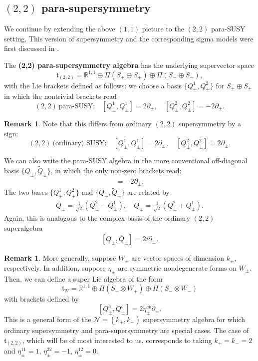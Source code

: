\documentclass[letterpaper,12pt]{article}
\newcommand{\RR}{\mathbb{R}}
\newcommand{\cN}{\mathcal{N}}
\newcommand{\p}{\partial}
\newcommand{\wtl}{\widetilde}
\theoremstyle{definition}
\newtheorem{remark}[theorem]{Remark}
\theoremstyle{remark}
\theoremstyle{examples}
\begin{document}
\subsection{$(2,2)$ para-supersymmetry}\label{sec:(2,2)parasusy}
We continue by extending the above $(1,1)$ picture to the $(2,2)$ para-SUSY setting. This version of supersymmetry and the corresponding sigma models were first discussed in \cite{HullTwistedSUSY}.

The {\bf (2,2) para-supersymmetry algebra} has the underlying supervector space
\[
\mathfrak{t}_{(2,2)} = \RR^{1,1} \oplus \Pi(S_+ \oplus S_+) \oplus \Pi(S_- \oplus S_-),
\]
with the Lie brackets defined as follows: we choose a basis $\{Q^1_{\pm}, Q^2_\pm\}$ for $S_\pm \oplus S_\pm$ in which the nontrivial brackets read 
\begin{equation}\label{eq:(2,2)para}
(2,2)\ \text{para-SUSY:}\quad [Q_\pm^1, Q_\pm^1] = 2 \partial_{\pm}, \quad [Q_{\pm}^2, Q_{\pm}^2] = -2 \partial_{\pm} .
\end{equation}

\begin{remark}
Note that this differs from ordinary $(2,2)$ supersymmetry by a sign:
\begin{equation*}
(2,2)\ \text{(ordinary) SUSY:}\quad [Q_\pm^1, Q_\pm^1] = 2 \partial_{\pm}, \quad [Q_{\pm}^2, Q_{\pm}^2] = 2 \partial_{\pm} .
\end{equation*}
\end{remark}

We can also write the para-SUSY algebra in the more conventional off-diagonal basis $\{{Q}_\pm,\wtl{Q}_\pm\}$, in which the only non-zero brackets read:
\begin{align*}
[{Q}_\pm,\wtl{Q}_\pm]=-2\p_\pm.
\end{align*}
The two bases $\{Q^1_{\pm}, Q^2_\pm\}$ and $\{{Q}_\pm,\wtl{Q}_\pm\}$ are related by
\begin{align}\label{parasusy_offdiagonal_basis}
Q_\pm=\frac{1}{\sqrt{2}}(Q^2_\pm-Q^1_\pm),\quad \wtl{Q}_\pm=\frac{1}{\sqrt{2}}(Q^2_\pm+Q^1_\pm).
\end{align}
Again, this is analogous to the complex basis of the ordinary $(2,2)$ superalgebra
\begin{align}\label{complex_(2,2)}
[Q_\pm,\overline{Q}_\pm]=2i\p_\pm.
\end{align}

\begin{remark}

More generally, suppose $W_\pm$ are vector spaces of dimension $k_\pm$, respectively.
In addition, suppose $\eta_\pm$ are symmetric nondegenerate forms on $W_\pm$. 
Then, we can define a super Lie algebra of the form
\[
\mathfrak{t}_{W} =  \RR^{1,1} \oplus \Pi(S_+ \otimes W_+) \oplus \Pi(S_- \otimes W_-)
\]
with brackets defined by
\[
[Q_\pm^{a}, Q_\pm^{b}] = 2 \eta^{ab}_\pm \partial_\pm .
\] 
This is a general form of the $\cN = (k_+, k_-)$ supersymmetry algebra for which ordinary supersymmetry and para-supersymmetry are special cases.
The case of $\mathfrak{t}_{(2,2)}$, which will be of most interested to us, corresponds to taking $k_+ = k_- = 2$ and $\eta_\pm^{11} = 1$, $\eta^{22}_\pm = - 1$, $\eta^{12}_{\pm} = 0$. 

\end{remark}
\end{document}
